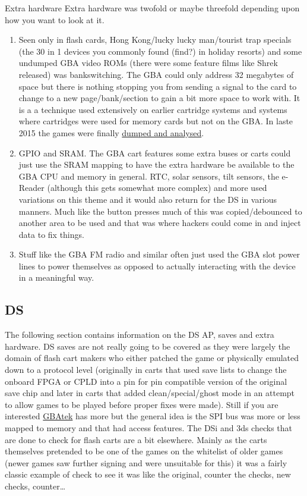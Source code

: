 \documentclass[
]{book}
\providecommand{\tightlist}{%
  \setlength{\itemsep}{0pt}\setlength{\parskip}{0pt}}
\begin{document}
Extra hardware Extra hardware was twofold or maybe threefold depending upon how you want to look at it.

\begin{enumerate}
\def\labelenumi{\arabic{enumi}.}
\tightlist
\item
  Seen only in flash cards, Hong Kong/lucky lucky man/tourist trap specials (the 30 in 1 devices you commonly found (find?) in holiday resorts) and some undumped GBA video ROMs (there were some feature films like Shrek released) was bankswitching. The GBA could only address 32 megabytes of space but there is nothing stopping you from sending a signal to the card to change to a new page/bank/section to gain a bit more space to work with. It is a a technique used extensively on earlier cartridge systems and systems where cartridges were used for memory cards but not on the GBA. In laste 2015 the games were finally \href{https://mgba.io/2015/10/20/dumping-the-undumped/}{dumped and analysed}.
\item
  GPIO and SRAM. The GBA cart features some extra buses or carts could just use the SRAM mapping to have the extra hardware be available to the GBA CPU and memory in general. RTC, solar sensors, tilt sensors, the e-Reader (although this gets somewhat more complex) and more used variations on this theme and it would also return for the DS in various manners. Much like the button presses much of this was copied/debounced to another area to be used and that was where hackers could come in and inject data to fix things.
\item
  Stuff like the GBA FM radio and similar often just used the GBA slot power lines to power themselves as opposed to actually interacting with the device in a meaningful way.
\end{enumerate}

\hypertarget{ds-2}{%
\subsection{DS}\label{ds-2}}

The following section contains information on the DS AP, saves and extra hardware. DS saves are not really going to be covered as they were largely the domain of flash cart makers who either patched the game or physically emulated down to a protocol level (originally in carts that used save lists to change the onboard FPGA or CPLD into a pin for pin compatible version of the original save chip and later in carts that added clean/special/ghost mode in an attempt to allow games to be played before proper fixes were made). Still if you are interested \href{http://problemkaputt.de/gbatek.htm\#dscartridgebackup}{GBAtek} has more but the general idea is the SPI bus was more or less mapped to memory and that had access features. The DSi and 3ds checks that are done to check for flash carts are a bit elsewhere. Mainly as the carts themselves pretended to be one of the games on the whitelist of older games (newer games saw further signing and were unsuitable for this) it was a fairly classic example of check to see it was like the original, counter the checks, new checks, counter\ldots{}
\end{document}
